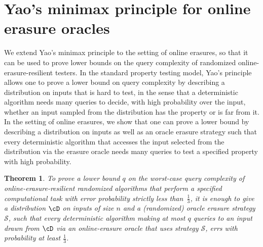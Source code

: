 \documentclass[11pt]{article}
\numberwithin{equation}{section}
\newtheorem{theorem}{Theorem}[section]
\theoremstyle{definition}
\theoremstyle{plain}
\begin{document}
	

	
	
%
\section{Yao's minimax principle for online erasure oracles}\label{sec:yao}
	
	We extend Yao's minimax principle \cite{Yao77} to the setting of online erasures, so that it can be used  to prove lower bounds on the query complexity of randomized online-erasure-resilient testers. In the standard property testing model, Yao's principle allows one to prove a lower bound on query complexity by describing a distribution on inputs that is hard to test, in the sense that a deterministic algorithm needs many queries to decide, with high probability over the input, whether an input sampled from the distribution has the property or is far from it. In the setting of online erasures, we show that one can prove a lower bound by describing a distribution on inputs as well as an oracle erasure strategy such that every deterministic algorithm that accesses the input selected from the distribution via the erasure oracle needs many queries to test a specified property with high  probability. 
	
	\begin{theorem}
		\label{thm:yao}
		To prove a lower bound $q$ on the worst-case query complexity of online-erasure-resilient randomized algorithms that perform a specified computational task with error probability strictly less than~$\frac{1}{3}$, it is enough to give a distribution $\cD$ on inputs of size $n$ and a (randomized) oracle erasure strategy $\mathcal{S}$, such that every deterministic algorithm making at most $q$ queries to an input drawn from $\cD$ via an online-erasure oracle that uses strategy $\mathcal{S}$, errs with probability at least $\frac{1}{3}$.
	\end{theorem}

%
	
\end{document}
